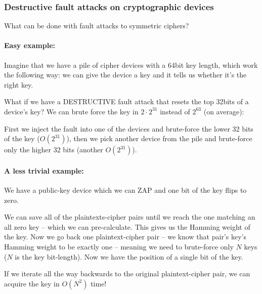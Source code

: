 \subsubsection*{Destructive fault attacks on cryptographic devices}\label{subsubsec:destructive_fault_attacks_on_cryptographic_devices}
What can be done with fault attacks to symmetric ciphers?
\paragraph{Easy example:} Imagine that we have a pile of cipher devices with a 64bit key length, which work the following way: we can give the device a key and it tells us whether it's the right key.

What if we have a DESTRUCTIVE fault attack that resets the top 32bits of a 
device's key? We can brute force the key in \(2\cdot 2^{31}\) instead of
\(2^{63}\) (on average):

First we inject the fault into one of the devices and brute-force the lower 32 
bits of the key (\(O(2^{31})\)), then we pick another device from the pile and 
brute-force only the higher 32 bits (another \(O(2^{31})\)).

\paragraph{A less trivial example:} We have a public-key device which we can ZAP and one bit of the key flips to zero.

We can save all of the plaintexts-cipher pairs until we reach the one matching an all zero key -- which we can pre-calculate. This gives us the Hamming weight of the key.
Now we go back one plaintext-cipher pair -- we know that pair's key's Hamming weight to be exactly one -- meaning we need to brute-force only \(N\) keys 
(\(N\) is the key bit-length). Now we have the position of a single bit of the key.

If we iterate all the way backwards to the original plaintext-cipher pair, we can acquire the key in \(O(N^2)\) time!

